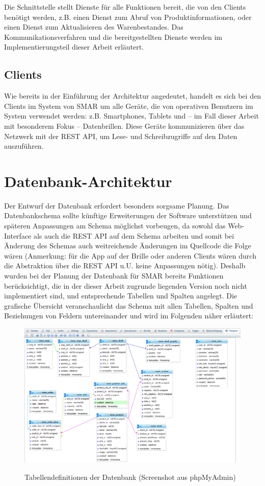Die Schnittstelle stellt Dienste für alle Funktionen bereit, die von den Clients benötigt werden, z.B. einen Dienst zum Abruf von Produktinformationen, oder einen Dienst zum Aktualisieren des Warenbestandes. Das Kommunikationsverfahren und die bereitgestellten Dienste werden im Implementierungsteil dieser Arbeit erläutert.

\subsection{Clients}
Wie bereits in der Einführung der Architektur angedeutet, handelt es sich bei den Clients im System von SMAR um alle Geräte, die von operativen Benutzern im System verwendet werden: z.B. Smartphones, Tablets und -- im Fall dieser Arbeit mit besonderem Fokus -- Datenbrillen. Diese Geräte kommunizieren über das Netzwerk mit der REST API, um Lese- und Schreibzugriffe auf den Daten auszuführen.

\section{Datenbank-Architektur}
\label{sec:architektur_datenbank}

Der Entwurf der Datenbank erfordert besonders sorgsame Planung. Das Datenbankschema sollte künftige Erweiterungen der Software unterstützen und späteren Anpassungen am Schema möglichst vorbeugen, da sowohl das Web-Interface als auch die REST API auf dem Schema arbeiten und somit bei Änderung des Schemas auch weitreichende Änderungen im Quellcode die Folge wären (Anmerkung: für die App auf der Brille oder anderen Clients wären durch die Abstraktion über die REST API u.U. keine Anpassungen nötig).
Deshalb wurden bei der Planung der Datenbank für SMAR bereits Funktionen berücksichtigt, die in der dieser Arbeit zugrunde liegenden Version noch nicht implementiert sind, und entsprechende Tabellen und Spalten angelegt. Die grafische Übersicht veranschaulicht das Schema mit allen Tabellen, Spalten und Beziehungen von Feldern untereinander und wird im Folgenden näher erläutert:

\begin{figure}[H]
	\centering
	{\includegraphics[width=\textwidth]{Bilder/Abbildungen/architektur_datenbankschema.png}}
	\caption{Tabellendefinitionen der Datenbank (Screenshot aus phpMyAdmin)}
	\label{fig:architektur_datenbankschema}
\end{figure}

